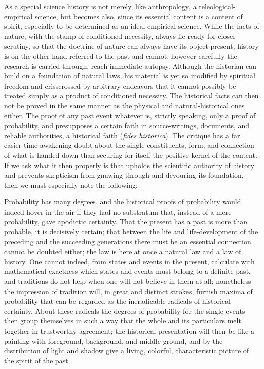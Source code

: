 \documentclass[12pt]{book}
\begin{document}
\noindent As a special science history is not merely, like anthropology, a
teleological-empirical science, but becomes also, since its essential content is a content
of spirit, especially to be determined as an ideal-empirical science. While the facts of
nature, with the stamp of conditioned necessity, always lie ready for closer scrutiny, so
that the doctrine of nature can always have its object present, history is on the other hand
referred to the past and cannot, however carefully the research is carried through, reach
immediate autopsy. Although the historian can build on a foundation of natural laws, his
material is yet so modified by spiritual freedom and crisscrossed by arbitrary endeavors
that it cannot possibly be treated simply as a product of conditioned necessity. The
historical facts can then not be proved in the same manner as the physical and
natural-historical ones either. The proof of any past event whatever is, strictly speaking,
only a proof of probability, and presupposes a certain faith in source-writings, documents,
and reliable authorities, a historical faith (\textit{fides historica}). The critique has a
far easier time awakening doubt about the single constituents, form, and connection of what
is handed down than securing for itself the positive kernel of the content. If we ask what
it then properly is that upholds the scientific authority of history and prevents skepticism
from gnawing through and devouring its foundation, then we must especially note the
following:

Probability has many degrees, and the historical proofs of probability would indeed hover in
the air if they had no substratum that, instead of a mere probability, gave apodictic
certainty. That the present has a past is more than probable, it is decisively certain; that
between the life and life-development of the preceding and the succeeding generations there
must be an essential connection cannot be doubted either; the law is here at once a natural
law and a law of history. One cannot indeed, from states and events in the present, calculate
with mathematical exactness which states and events must belong to a definite past, and
traditions do not help when one will not believe in them at all; nonetheless the impression of
tradition will, in great and distinct strokes, furnish maxima of probability that can be
regarded as the ineradicable radicals of historical certainty. About these radicals the
degrees of probability for the single events then group themselves in such a way that the
whole and its particulars melt together in trustworthy agreement; the historical presentation
will then be like a painting with foreground, background, and middle ground, and by the
distribution of light and shadow give a living, colorful, characteristic picture of the spirit
of the past.
\end{document}
